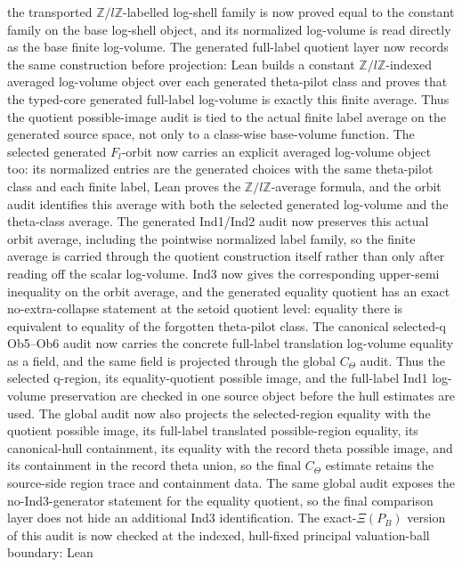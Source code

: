 \documentclass[11pt]{article}
\theoremstyle{plain}
\theoremstyle{definition}
\theoremstyle{remark}
\begin{document}
the transported \(\mathbb Z/l\mathbb Z\)-labelled log-shell family is now
proved equal to the constant family on the base log-shell object, and its
normalized log-volume is read directly as the base finite log-volume.  The generated
full-label quotient layer now records the same construction before projection:
Lean builds a constant \(\mathbb Z/l\mathbb Z\)-indexed averaged
log-volume object over each generated theta-pilot class and proves that the
typed-core generated full-label log-volume is exactly this finite average.
Thus the quotient possible-image audit is tied to the actual finite label
average on the generated source space, not only to a class-wise base-volume
function.  The selected generated \(F_l\)-orbit now carries an explicit
averaged log-volume object too: its normalized entries are the generated
choices with the same theta-pilot class and each finite label, Lean proves the
\(\mathbb Z/l\mathbb Z\)-average formula, and the orbit audit identifies this
average with both the selected generated log-volume and the theta-class
average.  The generated Ind1/Ind2 audit now preserves this actual orbit
average, including the pointwise normalized label family, so the finite
average is carried through the quotient construction itself rather than only
after reading off the scalar log-volume.  Ind3 now gives the corresponding
upper-semi inequality on the orbit average, and the generated equality quotient
has an exact no-extra-collapse statement at the setoid quotient level: equality
there is equivalent to equality of the forgotten theta-pilot class.  The
canonical selected-q Ob5--Ob6 audit now carries the concrete full-label
translation log-volume equality as a field, and the same field is projected
through the global \(C_\Theta\) audit.  Thus the selected q-region, its
equality-quotient possible image, and the full-label Ind1 log-volume
preservation are checked in one source object before the hull estimates are
used.  The global audit now also projects the selected-region equality with the
quotient possible image, its full-label translated possible-region equality,
its canonical-hull containment, its equality with the record theta possible
image, and its containment in the record theta union, so the final
\(C_\Theta\) estimate retains the source-side region trace and containment
data.  The same global audit exposes the no-Ind3-generator statement for the
equality quotient, so the final comparison layer does not hide an additional
Ind3 identification.  The exact-\(\Xi(P_B)\) version of this audit is now
checked at the indexed, hull-fixed principal valuation-ball boundary: Lean
\end{document}
